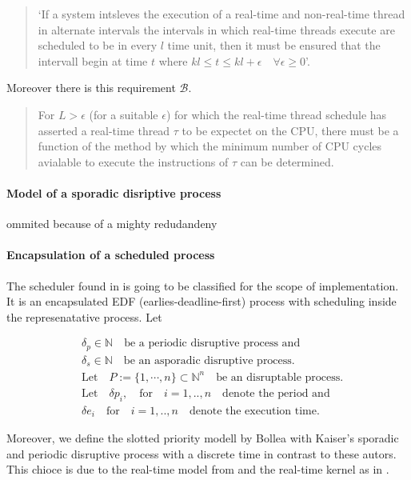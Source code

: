 \begin{quote}
	`If a system intsleves the execution of a real-time and non-real-time thread in alternate intervals the intervals in which real-time threads execute are scheduled to be in every $l$ time unit, then it must be ensured that the intervall begin at time $t$ where $kl \leq t \leq kl+\epsilon \quad \forall
 \epsilon \geq 0$'.
\end{quote}

Moreover there is this requirement $\mathcal{B}$.
\begin{quote}
For $L>\epsilon$ (for a suitable $\epsilon$) for which the real-time thread schedule has asserted a real-time thread $\tau$ to be expectet on the CPU, there must be a function of the method by which the minimum number of CPU cycles avialable to execute the instructions of $\tau$ can be determined.
\end{quote}

\paragraph{Model of a sporadic disriptive process}
ommited because of a mighty redudandeny

\paragraph*{Encapsulation of a scheduled process}
 
The scheduler found  in \cite{K} is going to be classified for the scope of implementation. It is an encapsulated EDF (earlies-deadline-first) process with scheduling inside the represenatative process. Let
      
\begin{align}
 & \delta_p \in \mathbb{N} \quad \text{be a periodic disruptive process and}\\
 	&\delta_s \in  \mathbb{N} \quad \text{be an asporadic disruptive process.}\\
	 &\text{Let} \quad P := \{1, \cdots, n \} \subset \mathbb{N}^n \quad \text{be an disruptable process.}  \\
 	&\text{Let} \quad  \delta p_i, \quad \text{for} \quad i = 1,..,n \quad  \text{denote the period and}  \\
 	&\delta e_i \quad \text{for} \quad  i = 1,..,n \quad  \text{denote the execution time}.  
\end{align}   

Moreover, we define the slotted priority modell by Bollea with Kaiser's sporadic and periodic disruptive process with a discrete time in contrast to these autors.
This chioce is due to the real-time model from \cite{PROSA_schedubility_analysis} and the real-time kernel as in  \cite[chp. 5.3]{B}. 

